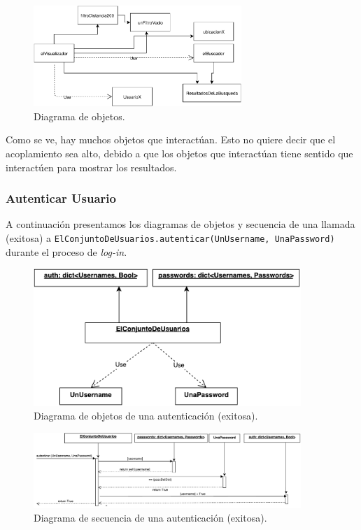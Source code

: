 \begin{figure}[H]
  \centering
  \includegraphics[width=0.7\textwidth]{diagramas/objetos_4.pdf}
  \caption{\normalfont Diagrama de objetos.}
\end{figure}

Como se ve, hay muchos objetos que interactúan. Esto no quiere decir que el acoplamiento sea alto, debido a que los objetos que interactúan tiene sentido que interactúen para mostrar los resultados.

\subsubsection{Autenticar Usuario}

\par A continuación presentamos los diagramas de objetos y secuencia de una llamada (exitosa) a 
\texttt{ElConjuntoDeUsuarios.autenticar(UnUsername, UnaPassword)} durante el proceso de \textit{log-in}.

\begin{figure}[ht]
    \centering
    \includegraphics[width=0.9\textwidth]{diagramas/ObjetosLogIn.pdf}
    \caption{Diagrama de objetos de una autenticación (exitosa).}\label{ObjLogIn}
\end{figure}

\begin{figure}[ht]
    \centering
    \includegraphics[width=0.9\textwidth]{diagramas/SecuenciaLogIn.pdf}
    \caption{Diagrama de secuencia de una autenticación (exitosa).}\label{SecLogIn}
\end{figure}

